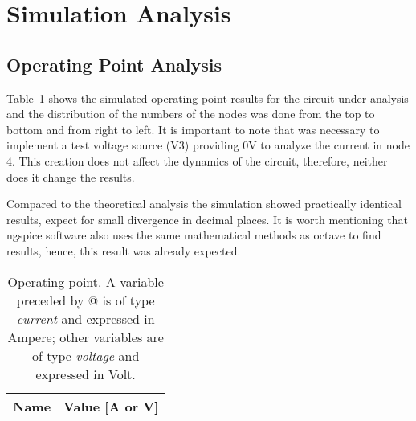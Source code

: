 \section{Simulation Analysis }
\label{sec:simulation}

\subsection{Operating Point Analysis}

Table~\ref{tab:op} shows the simulated operating point results for the circuit
under analysis and the distribution of the numbers of the nodes was done from the top to bottom and from right to left. It is important to note that was necessary to implement a test voltage source (V3) providing 0V to analyze the current in node 4. This creation does not affect the dynamics of the circuit, therefore, neither does it change the results.

Compared to the theoretical analysis the simulation showed practically identical results, expect for small divergence in decimal places. It is worth mentioning that ngspice software also uses the same mathematical methods as octave to find results, hence, this result was already expected.

\begin{table}[h]
  \centering
  \begin{tabular}{|l|r|}
    \hline    
    {\bf Name} & {\bf Value [A or V]} \\ \hline
    
  \end{tabular}
  \caption{Operating point. A variable preceded by @ is of type {\em current}
    and expressed in Ampere; other variables are of type {\it voltage} and expressed in
    Volt.}
  \label{tab:op}
\end{table}













